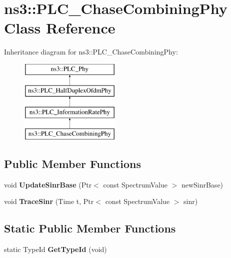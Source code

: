 \hypertarget{classns3_1_1PLC__ChaseCombiningPhy}{\section{ns3\-:\-:\-P\-L\-C\-\_\-\-Chase\-Combining\-Phy \-Class \-Reference}
\label{classns3_1_1PLC__ChaseCombiningPhy}
}
\-Inheritance diagram for ns3\-:\-:\-P\-L\-C\-\_\-\-Chase\-Combining\-Phy\-:\begin{figure}[H]
\begin{center}
\leavevmode
\includegraphics[height=4.000000cm]{classns3_1_1PLC__ChaseCombiningPhy}
\end{center}
\end{figure}
\subsection*{\-Public \-Member \-Functions}
\begin{DoxyCompactItemize}
\item 
\hypertarget{classns3_1_1PLC__ChaseCombiningPhy_a3f6ef56bfe7ca596b7cea28d55062b6e}{void {\bfseries \-Update\-Sinr\-Base} (\-Ptr$<$ const \-Spectrum\-Value $>$ new\-Sinr\-Base)}\label{classns3_1_1PLC__ChaseCombiningPhy_a3f6ef56bfe7ca596b7cea28d55062b6e}

\item 
\hypertarget{classns3_1_1PLC__ChaseCombiningPhy_ad0e1aff9fda496009bb40443ddcc9f65}{void {\bfseries \-Trace\-Sinr} (\-Time t, \-Ptr$<$ const \-Spectrum\-Value $>$ sinr)}\label{classns3_1_1PLC__ChaseCombiningPhy_ad0e1aff9fda496009bb40443ddcc9f65}

\end{DoxyCompactItemize}
\subsection*{\-Static \-Public \-Member \-Functions}
\begin{DoxyCompactItemize}
\item 
\hypertarget{classns3_1_1PLC__ChaseCombiningPhy_a5353e7770f41b5bb42bc4b8c769b0b35}{static \-Type\-Id {\bfseries \-Get\-Type\-Id} (void)}\label{classns3_1_1PLC__ChaseCombiningPhy_a5353e7770f41b5bb42bc4b8c769b0b35}

\end{DoxyCompactItemize}
